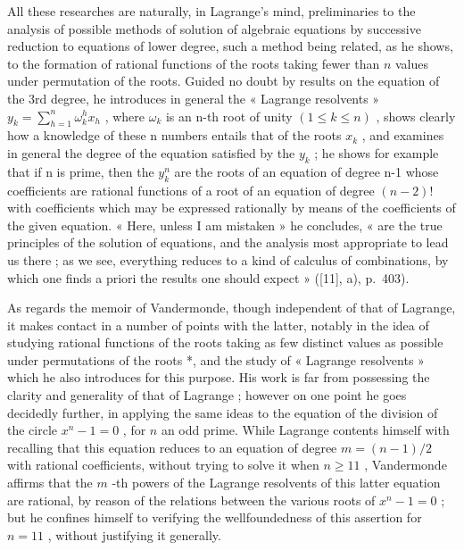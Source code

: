 All these researches are naturally, in Lagrange's mind, preliminaries to the analysis of possible methods of solution of algebraic equations by successive reduction to equations of lower degree, such a method being related, as he shows, to the formation of rational functions of the roots taking fewer than \(n\) values under permutation of the roots. Guided no doubt by results on the equation of the 3rd degree, he introduces in general the « Lagrange resolvents » \(y_{k} = \sum_{h=1}^{n} \omega_{k}^{h} x_{h}\) , where \(\omega_{k}\) is an n-th root of unity \((1 \leqslant k \leqslant n)\) , shows clearly how a knowledge of these n numbers entails that of the roots \(x_{k}\) , and examines in general the degree of the equation satisfied by the \(y_{k}\) ; he shows for example that if n is prime, then the \(y_{k}^{n}\) are the roots of an equation of degree n-1 whose coefficients are rational functions of a root of an equation of degree \((n-2)!\) with coefficients which may be expressed rationally by means of the coefficients of the given equation. « Here, unless I am mistaken » he concludes, « are the true principles of the solution of equations, and the analysis most appropriate to lead us there ; as we see, everything reduces to a kind of calculus of combinations, by which one finds a priori the results one should expect » ({[}11{]}, a), p.~403).

As regards the memoir of Vandermonde, though independent of that of Lagrange, it makes contact in a number of points with the latter, notably in the idea of studying rational functions of the roots taking as few distinct values as possible under permutations of the roots *, and the study of « Lagrange resolvents » which he also introduces for this purpose. His work is far from possessing the clarity and generality of that of Lagrange ; however on one point he goes decidedly further, in applying the same ideas to the equation of the division of the circle \(x^n - 1 = 0\) , for \(n\) an odd prime. While Lagrange contents himself with recalling that this equation reduces to an equation of degree \(m = (n - 1)/2\) with rational coefficients, without trying to solve it when \(n \geqslant 11\) , Vandermonde affirms that the \(m\) -th powers of the Lagrange resolvents of this latter equation are rational, by reason of the relations between the various roots of \(x^n - 1 = 0\) ; but he confines himself to verifying the wellfoundedness of this assertion for \(n = 11\) , without justifying it generally.

